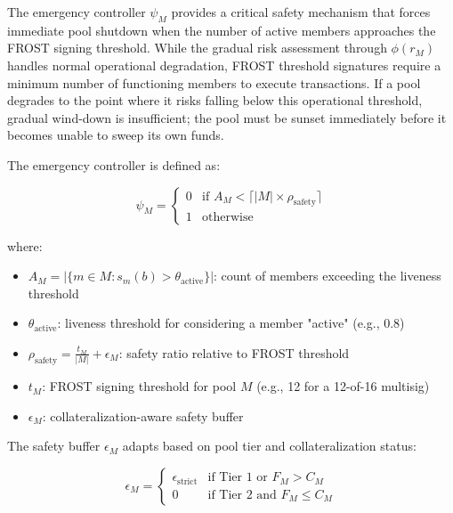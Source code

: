 The emergency controller $\psi_M$ provides a critical safety mechanism that forces immediate pool shutdown when the number of active members approaches the FROST signing threshold. While the gradual risk assessment through $\phi(r_M)$ handles normal operational degradation, FROST threshold signatures require a minimum number of functioning members to execute transactions. If a pool degrades to the point where it risks falling below this operational threshold, gradual wind-down is insufficient; the pool must be sunset immediately before it becomes unable to sweep its own funds.

The emergency controller is defined as:

\begin{equation}
    \label{eq:emergency-controller}
    \psi_M = \begin{cases}
        0 & \text{if } A_M < \lceil |M| \times \rho_{\text{safety}} \rceil \\
        1 & \text{otherwise}
    \end{cases}
\end{equation}

where:
\begin{itemize}
    \item $A_M = |\{m \in M : s_m(b) > \theta_{\text{active}}\}|$: count of members exceeding the liveness threshold
    \item $\theta_{\text{active}}$: liveness threshold for considering a member "active" (e.g., 0.8)
    \item $\rho_{\text{safety}} = \frac{t_M}{|M|} + \epsilon_M$: safety ratio relative to FROST threshold
    \item $t_M$: FROST signing threshold for pool $M$ (e.g., 12 for a 12-of-16 multisig)
    \item $\epsilon_M$: collateralization-aware safety buffer
\end{itemize}

The safety buffer $\epsilon_M$ adapts based on pool tier and collateralization status:

\begin{equation}
    \label{eq:safety-buffer}
    \epsilon_M = \begin{cases}
        \epsilon_{\text{strict}} & \text{if Tier 1 or } F_M > C_M     \\
        0                        & \text{if Tier 2 and } F_M \leq C_M
    \end{cases}
\end{equation}

